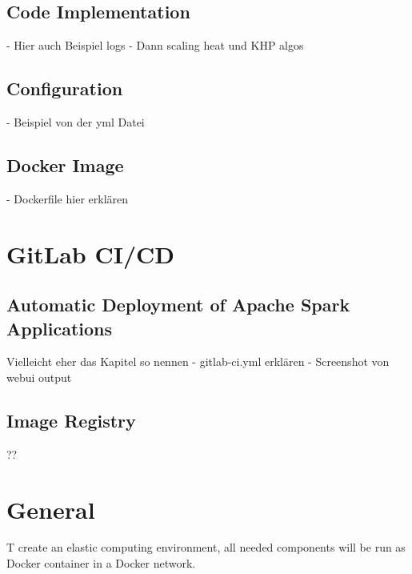 \subsection{Code Implementation}
- Hier auch Beispiel logs
- Dann scaling heat und KHP algos


\subsection{Configuration}
- Beispiel von der yml Datei


\subsection{Docker Image}
- Dockerfile hier erklären


\section{GitLab CI/CD}


\subsection{Automatic Deployment of Apache Spark Applications}
Vielleicht eher das Kapitel so nennen
- gitlab-ci.yml erklären
- Screenshot von webui output


\subsection{Image Registry}
??

































\section{General}
T create an elastic computing environment, all needed components will be run as Docker container in a Docker network.


